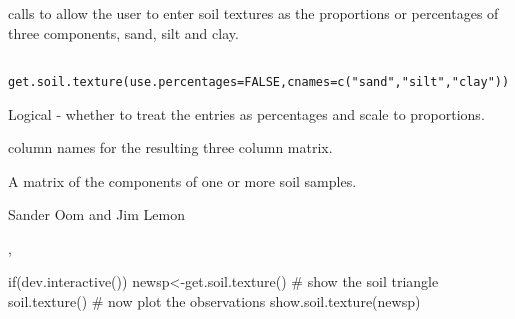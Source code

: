 \begin{Description}\relax
{} calls  to allow the user to 
enter soil textures as the proportions or percentages of three 
components, sand, silt and clay.
\end{Description}
\begin{Usage}
\begin{verbatim}
 get.soil.texture(use.percentages=FALSE,cnames=c("sand","silt","clay"))
\end{verbatim}
\end{Usage}
\begin{Arguments}
\begin{ldescription}
\item[\code{use.percentages}] Logical - whether to treat the entries as
percentages and scale to proportions.
\item[\code{cnames}] column names for the resulting three column matrix.
\end{ldescription}
\end{Arguments}
\begin{Value}
A matrix of the components of one or more soil samples.
\end{Value}
\begin{Author}\relax
Sander Oom and Jim Lemon
\end{Author}
\begin{SeeAlso}\relax
{},
\end{SeeAlso}
\begin{Examples}
\begin{ExampleCode}
 if(dev.interactive()) {
  newsp<-get.soil.texture()
  # show the soil triangle
  soil.texture()
  # now plot the observations
  show.soil.texture(newsp)
 }
\end{ExampleCode}
\end{Examples}

